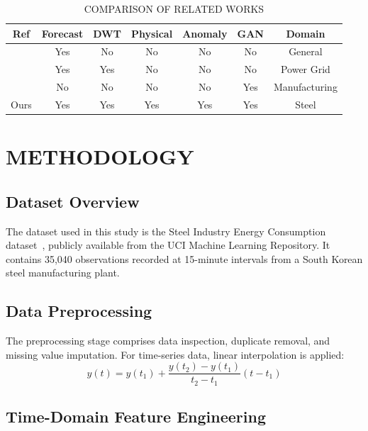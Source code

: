 \documentclass[conference]{IEEEtran}
\begin{document}
\begin{table}[htbp]
\caption{COMPARISON OF RELATED WORKS}
\label{tab:related}
\centering
\begin{tabular}{@{}ccccccc@{}}
\toprule
Ref & Forecast & DWT & Physical & Anomaly & GAN & Domain \\
\midrule
\cite{hippert2001} & Yes & No & No & No & No & General \\
\cite{zhang2024} & Yes & Yes & No & No & No & Power Grid \\
\cite{tang2025} & No & No & No & No & Yes & Manufacturing \\
Ours & Yes & Yes & Yes & Yes & Yes & Steel \\
\bottomrule
\end{tabular}
\end{table}

\section{METHODOLOGY}
\label{sec:methodology}

\subsection{Dataset Overview}

The dataset used in this study is the Steel Industry Energy 
Consumption dataset~\cite{uci2023}, publicly available from 
the UCI Machine Learning Repository. It contains 35,040 
observations recorded at 15-minute intervals from a South 
Korean steel manufacturing plant.

\subsection{Data Preprocessing}

The preprocessing stage comprises data inspection, duplicate 
removal, and missing value imputation. For time-series data, 
linear interpolation is applied:
\begin{equation}
y(t) = y(t_1) + \frac{y(t_2) - y(t_1)}{t_2 - t_1}(t - t_1)
\label{eq:interp}
\end{equation}

\subsection{Time-Domain Feature Engineering}
\end{document}
